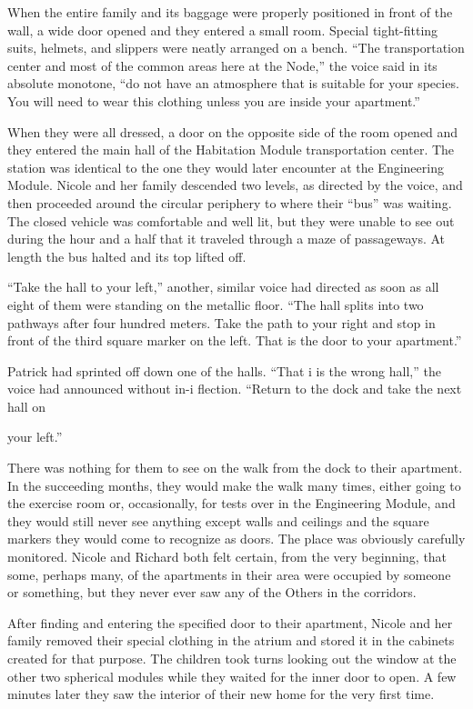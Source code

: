 \documentclass[]{article}
\begin{document}
{When the entire family and its baggage were properly positioned in front of the wall, a wide door opened and they entered a small room.  Special tight-fitting suits, helmets, and slippers were neatly arranged on a bench.  “The transportation center and most of the common areas here at the Node,” the voice said in its absolute monotone, “do not have an atmosphere that is suitable for your species.  You will need to wear this clothing unless you are inside your apartment.”

When they were all dressed, a door on the opposite side of the room opened and they entered the main hall of the Habitation Module transportation center.  The station was identical to the one they would later encounter at the Engineering Module.  Nicole and her family descended two levels, as directed by the voice, and then proceeded around the circular periphery to where their “bus” was waiting.  The closed vehicle was comfortable and well lit, but they were unable to see out during the hour and a half that it traveled through a maze of passageways.  At length the bus halted and its top lifted off.

“Take the hall to your left,” another, similar voice had directed as soon as all eight of them were standing on the metallic floor.  “The hall splits into two pathways after four hundred meters.  Take the path to your right and stop in front of the third square marker on the left.  That is the door to your apartment.”

Patrick had sprinted off down one of the halls.  “That i is the wrong hall,” the voice had announced without in-i flection.  “Return to the dock and take the next hall on

your left.”

There was nothing for them to see on the walk from the dock to their apartment.  In the succeeding months, they would make the walk many times, either going to the exercise room or, occasionally, for tests over in the Engineering Module, and they would still never see anything except walls and ceilings and the square markers they would come to recognize as doors.  The place was obviously carefully monitored.  Nicole and Richard both felt certain, from the very beginning, that some, perhaps many, of the apartments in their area were occupied by someone or something, but they never ever saw any of the Others in the corridors.

After finding and entering the specified door to their apartment, Nicole and her family removed their special clothing in the atrium and stored it in the cabinets created for that purpose.  The children took turns looking out the window at the other two spherical modules while they waited for the inner door to open.  A few minutes later they saw the interior of their new home for the very first time.

}
\end{document}
